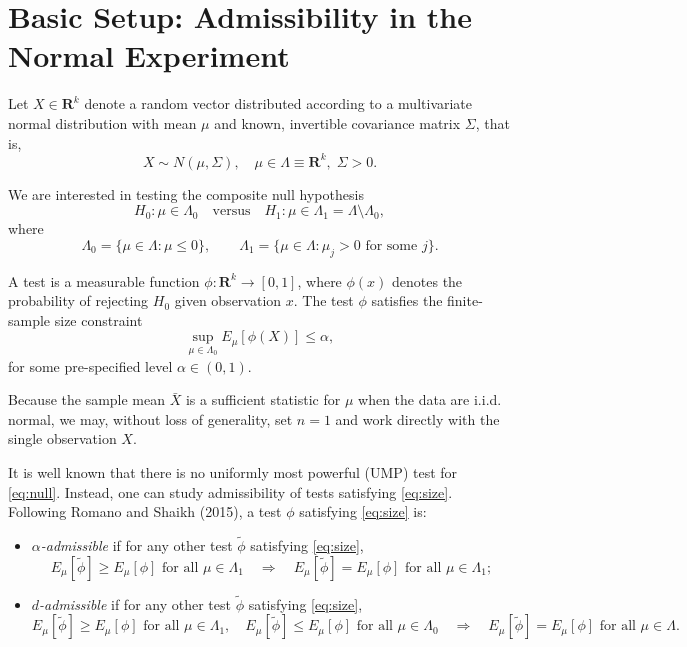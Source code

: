 \documentclass[12pt]{article}
\begin{document}
\section*{Basic Setup: Admissibility in the Normal Experiment}

Let $X \in \mathbf{R}^k$ denote a random vector distributed according to a multivariate normal distribution with mean $\mu$ and known, invertible covariance matrix $\Sigma$, that is,
\[
X \sim N(\mu, \Sigma), \quad \mu \in \Lambda \equiv \mathbf{R}^k, \; \Sigma > 0.
\]

We are interested in testing the composite null hypothesis
\begin{equation} \label{eq:null}
H_0 : \mu \in \Lambda_0 \quad \text{versus} \quad H_1 : \mu \in \Lambda_1 = \Lambda \setminus \Lambda_0,
\end{equation}
where
\[
\Lambda_0 = \{ \mu \in \Lambda : \mu \le 0 \}, \qquad \Lambda_1 = \{ \mu \in \Lambda : \mu_j > 0 \text{ for some } j \}.
\]

A test is a measurable function $\phi : \mathbf{R}^k \to [0,1]$, where $\phi(x)$ denotes the probability of rejecting $H_0$ given observation $x$.  The test $\phi$ satisfies the finite-sample size constraint
\begin{equation} \label{eq:size}
\sup_{\mu \in \Lambda_0} E_\mu[\phi(X)] \leq \alpha,
\end{equation}
for some pre-specified level $\alpha \in (0,1)$.

Because the sample mean $\bar X$ is a sufficient statistic for $\mu$ when the data are i.i.d. normal, we may, without loss of generality, set $n=1$ and work directly with the single observation $X$.

It is well known that there is no uniformly most powerful (UMP) test for \eqref{eq:null}.  Instead, one can study admissibility of tests satisfying \eqref{eq:size}.  Following Romano and Shaikh (2015), a test $\phi$ satisfying \eqref{eq:size} is:
\begin{itemize}
    \item \emph{$\alpha$-admissible} if for any other test $\tilde \phi$ satisfying \eqref{eq:size},
    \[
    E_\mu[\tilde \phi] \ge E_\mu[\phi] \text{ for all } \mu \in \Lambda_1
    \quad \Rightarrow \quad
    E_\mu[\tilde \phi] = E_\mu[\phi] \text{ for all } \mu \in \Lambda_1;
    \]
    \item \emph{$d$-admissible} if for any other test $\tilde \phi$ satisfying \eqref{eq:size},
    \[
    E_\mu[\tilde \phi] \ge E_\mu[\phi] \text{ for all } \mu \in \Lambda_1, \quad
    E_\mu[\tilde \phi] \le E_\mu[\phi] \text{ for all } \mu \in \Lambda_0
    \quad \Rightarrow \quad
    E_\mu[\tilde \phi] = E_\mu[\phi] \text{ for all } \mu \in \Lambda.
    \]
\end{itemize}
\end{document}

